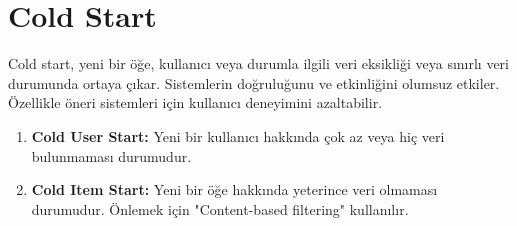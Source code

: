 \section{Cold Start}
Cold start, yeni bir öğe, kullanıcı veya durumla ilgili veri eksikliği veya sınırlı veri durumunda ortaya çıkar. Sistemlerin doğruluğunu ve etkinliğini olumsuz etkiler. Özellikle öneri sistemleri için kullanıcı deneyimini azaltabilir.

\begin{enumerate}
    \item \textbf{Cold User Start:} Yeni bir kullanıcı hakkında çok az veya hiç veri bulunmaması durumudur.
    \item \textbf{Cold Item Start:} Yeni bir öğe hakkında yeterince veri olmaması durumudur. Önlemek için "Content-based filtering" kullanılır.
\end{enumerate}

\newpage